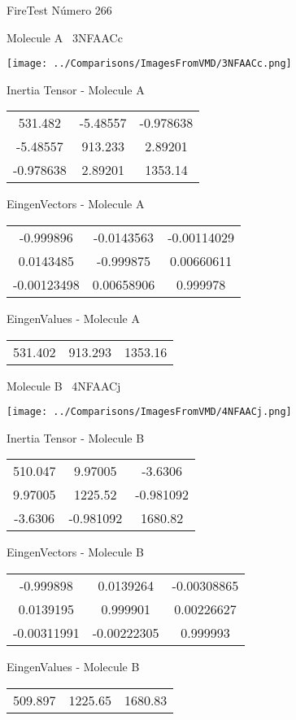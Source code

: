 \vtab[-3cm]
\begin{center}
{\large FireTest \tab Número 266}
\end{center}
\begin{multicols}{2}
\begin{center}

Molecule A \
3NFAACc

\texttt{[image: ../Comparisons/ImagesFromVMD/3NFAACc.png]}

Inertia Tensor - Molecule A \\
\begin{tabular}{|c c c|}
531.482	 & 	-5.48557	 & 	-0.978638	 \\
-5.48557	 & 	913.233	 & 	2.89201	 \\
-0.978638	 & 	2.89201	 & 	1353.14
\end{tabular}

\vtab
 EingenVectors - Molecule A     \\
\begin{tabular}{|c c c|}
-0.999896	 & 	-0.0143563	 & 	-0.00114029	 \\
0.0143485	 & 	-0.999875	 & 	0.00660611	 \\
-0.00123498	 & 	0.00658906	 & 	0.999978
\end{tabular}

\vtab
 EingenValues - Molecule A     \\
\begin{tabular}{|c c c|}
531.402	 & 	913.293	 & 	1353.16	 \\
\end{tabular}
\columnbreak

Molecule B \
4NFAACj

\texttt{[image: ../Comparisons/ImagesFromVMD/4NFAACj.png]}

Inertia Tensor - Molecule B \\
\begin{tabular}{|c c c|}
510.047	 & 	9.97005	 & 	-3.6306	 \\
9.97005	 & 	1225.52	 & 	-0.981092	 \\
-3.6306	 & 	-0.981092	 & 	1680.82
\end{tabular}

\vtab
 EingenVectors - Molecule B     \\
\begin{tabular}{|c c c|}
-0.999898	 & 	0.0139264	 & 	-0.00308865	 \\
0.0139195	 & 	0.999901	 & 	0.00226627	 \\
-0.00311991	 & 	-0.00222305	 & 	0.999993
\end{tabular}

\vtab
 EingenValues - Molecule B     \\
\begin{tabular}{|c c c|}
509.897	 & 	1225.65	 & 	1680.83	 \\
\end{tabular}

\end{center}
\end{multicols}

